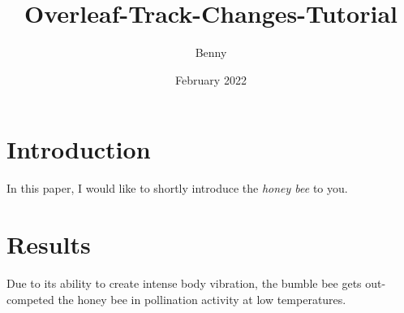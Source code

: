 \documentclass{article}
\title{Overleaf-Track-Changes-Tutorial}
\author{Benny}
\date{February 2022}
\begin{document}
\maketitle

\section{Introduction}

In this paper, I would like to shortly introduce the \textit{honey bee} to you.

\section{Results}

Due to its ability to create intense body vibration, the bumble bee gets out-competed the honey bee in pollination activity at low temperatures.
\end{document}
